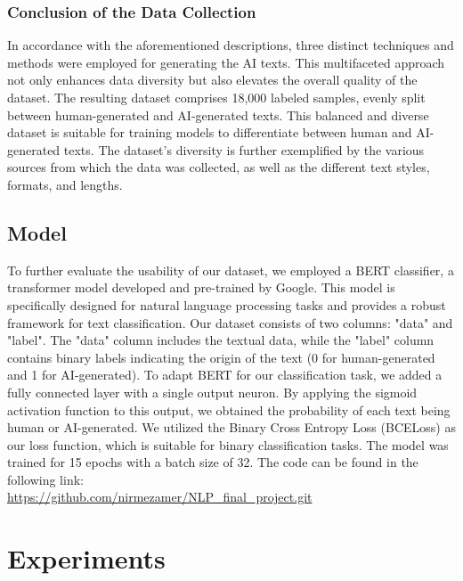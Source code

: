 \documentclass[11pt]{article}
\begin{document}
\subsubsection{Conclusion of the Data Collection}
In accordance with the aforementioned descriptions, three distinct techniques and methods were employed for generating the AI texts. This multifaceted approach not only enhances data diversity but also elevates the overall quality of the dataset. The resulting dataset comprises 18,000 labeled samples, evenly split between human-generated and AI-generated texts. This balanced and diverse dataset is suitable for training models to differentiate between human and AI-generated texts. The dataset's diversity is further exemplified by the various sources from which the data was collected, as well as the different text styles, formats, and lengths.
\subsection{Model}
To further evaluate the usability of our dataset, we employed a BERT classifier, a transformer model developed and pre-trained by Google. This model is specifically designed for natural language processing tasks and provides a robust framework for text classification.
Our dataset consists of two columns: "data" and "label". The "data" column includes the textual data, while the "label" column contains binary labels indicating the origin of the text (0 for human-generated and 1 for AI-generated). To adapt BERT for our classification task, we added a fully connected layer with a single output neuron. By applying the sigmoid activation function to this output, we obtained the probability of each text being human or AI-generated.
We utilized the Binary Cross Entropy Loss (BCELoss) as our loss function, which is suitable for binary classification tasks. The model was trained for 15 epochs with a batch size of 32.
The code can be found in the following link:\\\url{https://github.com/nirmezamer/NLP_final_project.git}

\section{Experiments}
\end{document}
